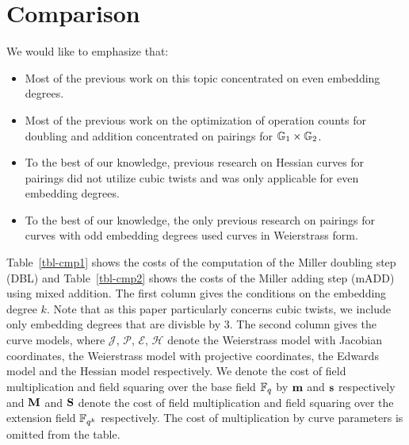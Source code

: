 \section{Comparison}
\label{sec:cmp}

We would like to emphasize that:
\begin{itemize}
\item	Most of the previous work on this topic concentrated on even embedding degrees.
\item   Most of the previous work on the optimization of operation counts for doubling and addition concentrated on pairings for $\mathbb{G}_{1} \times \mathbb{G}_{2}$.
\item   To the best of our knowledge, previous research on Hessian curves for pairings did not utilize cubic twists and was only applicable for even embedding degrees.
\item   To the best of our knowledge, the only previous research on pairings for curves with odd embedding degrees used curves in Weierstrass form.
\end{itemize}

Table~\ref{tbl-cmp1} shows the costs of the computation of the Miller doubling step (DBL) and Table~\ref{tbl-cmp2} shows the costs of the Miller adding step (mADD) using mixed addition.
The first column gives the conditions on the embedding degree $k$.
Note that as this paper particularly concerns cubic twists, we include only embedding degrees that are divisble by 3.
The second column gives the curve models, where 
$\mathcal{J}$, $\mathcal{P}$, $\mathcal{E}$, $\mathcal{H}$ denote the
Weierstrass model with Jacobian coordinates, the
Weierstrass model with projective coordinates,
the Edwards model and the
Hessian model respectively.
We denote the cost of field multiplication and field squaring over the base field $\mathbb{F}_{q}$ by $\textbf{m}$ and $\textbf{s}$ respectively and $\textbf{M}$ and $\textbf{S}$ denote the cost of field multiplication and field squaring over the extension field $\mathbb{F}_{q^k}$ respectively.
The cost of multiplication by curve parameters is omitted from the table.

